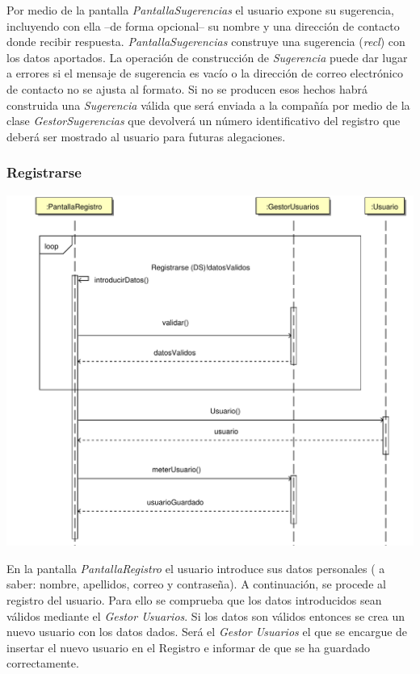 \documentclass[11pt, a4paper, twoside, titlepage]{article}
\begin{document}
				Por medio de la pantalla {\itshape PantallaSugerencias} el usuario expone su sugerencia, incluyendo con ella --de forma opcional-- su nombre y una dirección de contacto donde recibir respuesta. {\itshape PantallaSugerencias} construye una sugerencia ({\itshape recl}) con los datos aportados. La operación de construcción de {\itshape Sugerencia} puede dar lugar a errores si el mensaje de sugerencia es vacío o la dirección de correo electrónico de contacto no se ajusta al formato. Si no se producen esos hechos habrá construida una {\itshape Sugerencia} válida que será enviada a la compañía por medio de la clase {\itshape GestorSugerencias} que devolverá un número identificativo del registro que deberá ser mostrado al usuario para futuras alegaciones.

			\subsubsection{Registrarse}
				\begin{center}
					\includegraphics[scale=.54]{diseno/diagramas/registrarse.pdf}
				\end{center}
				
				En la pantalla {\itshape PantallaRegistro} el usuario introduce sus datos personales ( a saber: nombre, apellidos, correo y contraseña).  A continuación, se procede al registro del usuario. Para ello se comprueba que los datos introducidos sean válidos mediante el  {\itshape Gestor Usuarios}. Si los datos son válidos entonces se crea un nuevo usuario con los datos dados. Será el  {\itshape Gestor Usuarios} el que se encargue de insertar el nuevo usuario en el Registro  e informar de que se ha guardado correctamente.
\end{document}
